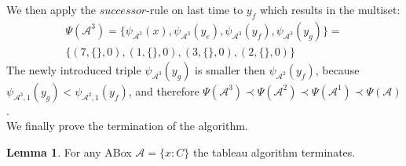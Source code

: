 \documentclass{book}
\theoremstyle{break}
\theoremstyle{definition}
\newtheorem{mylem}{Lemma}
\begin{document}
We then apply the $successor$-rule on last time to $y_f$ which results in the multiset:
\begin{align}
\Psi(\mathcal{A}^3)=\{\psi_{\mathcal{A}^3}(x),\psi_{\mathcal{A}^3}(y_e), \psi_{\mathcal{A}^3}(y_f),\psi_{\mathcal{A}^3}(y_g)\}=\nonumber\\
\{(7,\{\},0),(1,\{\},0),(3,\{\},0),(2,\{\},0)\}
\end{align}
The newly introduced triple $\psi_{\mathcal{A}^3}(y_g)$ is smaller then $\psi_{\mathcal{A}^2}(y_f)$, because $\psi_{\mathcal{A}^3,1}(y_g)<\psi_{\mathcal{A}^2,1}(y_f)$, and therefore $\Psi(\mathcal{A}^3)\prec \Psi(\mathcal{A}^2)\prec\Psi(\mathcal{A}^1)\prec\Psi(\mathcal{A})$.\\
We finally prove the termination of the algorithm.
\begin{mylem} \label{termination}
For any ABox $\mathcal{A}=\{x:C\}$ the tableau algorithm terminates.
\end{mylem}
\end{document}
